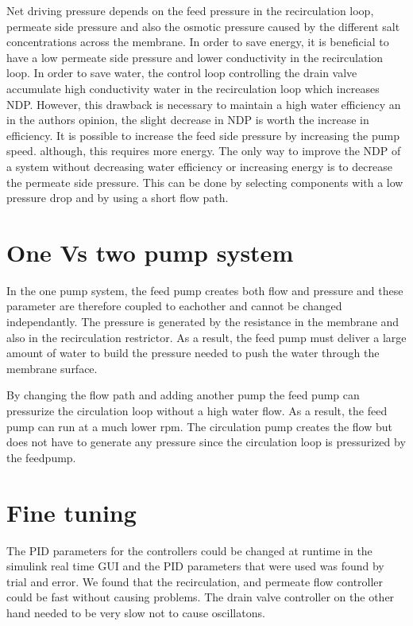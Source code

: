 Net driving pressure depends on the feed pressure in the recirculation loop, permeate side pressure and also the osmotic pressure caused by the different salt concentrations across the membrane. In order to save energy, it is beneficial to have a low permeate side pressure and lower conductivity in the recirculation loop. In order to save water, the control loop controlling the drain valve accumulate high conductivity water in the recirculation loop which increases NDP. However, this drawback is necessary to maintain a high water efficiency an in the authors opinion, the slight decrease in NDP is worth the increase in efficiency. It is possible to increase the feed side pressure by increasing the pump speed. although, this requires more energy. The only way to improve the NDP of a system without decreasing water efficiency or increasing energy is to decrease the permeate side pressure. This can be done by selecting components with a low pressure drop and by using a short flow path.

\section{One Vs two pump system}

In the one pump system, the feed pump creates both flow and pressure and these parameter are therefore coupled to eachother and cannot be changed independantly. The pressure is generated by the resistance in the membrane and also in the recirculation restrictor. As a result, the feed pump must deliver a large amount of water to build the pressure needed to push the water through the membrane surface. 

By changing the flow path and adding another pump the feed pump can pressurize the circulation loop without a high water flow. As a result, the feed pump can run at a much lower rpm. The circulation pump creates the flow but does not have to generate any pressure since the circulation loop is pressurized by the feedpump.

\section{Fine tuning}

The PID parameters for the controllers could be changed at runtime in the simulink real time GUI and the PID parameters that were used was found by trial and error. We found that the recirculation, and permeate flow controller could be fast without causing problems. The drain valve controller on the other hand needed to be very slow not to cause oscillatons. 

